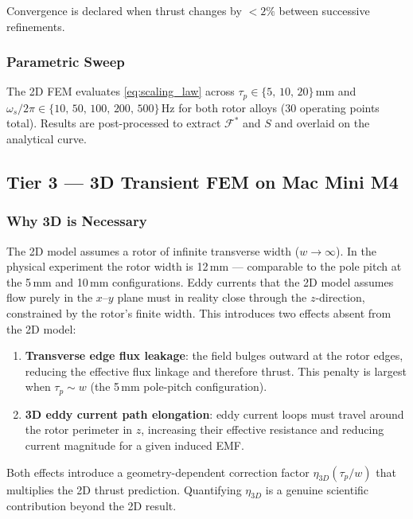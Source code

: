 \documentclass[12pt,letterpaper]{article}
\begin{document}
Convergence is declared when thrust changes by $< 2\%$ between successive refinements.

\subsubsection{Parametric Sweep}

The 2D FEM evaluates \cref{eq:scaling_law} across
$\tau_p \in \{5,\,10,\,20\}$\,mm and $\omega_s/2\pi \in \{10,\,50,\,100,\,200,\,500\}$\,Hz
for both rotor alloys (30 operating points total). Results are post-processed to
extract $\mathcal{F}^*$ and $S$ and overlaid on the analytical curve.

\subsection{Tier 3 — 3D Transient FEM on Mac Mini M4}
\label{sec:tier3}

\subsubsection{Why 3D is Necessary}

The 2D model assumes a rotor of infinite transverse width ($w \to \infty$). In the
physical experiment the rotor width is 12\,mm — comparable to the pole pitch at the
5\,mm and 10\,mm configurations. Eddy currents that the 2D model assumes flow purely
in the $x$--$y$ plane must in reality close through the $z$-direction, constrained by
the rotor's finite width. This introduces two effects absent from the 2D model:

\begin{enumerate}[noitemsep]
  \item \textbf{Transverse edge flux leakage}: the field bulges outward at the rotor
    edges, reducing the effective flux linkage and therefore thrust. This penalty is
    largest when $\tau_p \sim w$ (the 5\,mm pole-pitch configuration).
  \item \textbf{3D eddy current path elongation}: eddy current loops must travel
    around the rotor perimeter in $z$, increasing their effective resistance and
    reducing current magnitude for a given induced EMF.
\end{enumerate}

Both effects introduce a geometry-dependent correction factor $\eta_{3D}(\tau_p/w)$
that multiplies the 2D thrust prediction. Quantifying $\eta_{3D}$ is a genuine
scientific contribution beyond the 2D result.
\end{document}
